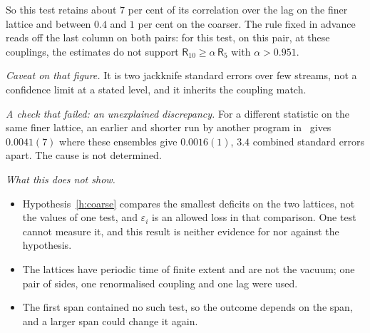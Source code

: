 So this test retains about $7$ per cent of its correlation over the lag on the finer lattice and between
$0.4$ and $1$ per cent on the coarser. The rule fixed in advance reads off the last column on both pairs: for
this test, on this pair, at these couplings, the estimates do not support
$\mathsf R_{10}\ge\alpha\,\mathsf R_5$ with $\alpha>0.951$.

\emph{Caveat on that figure.} It is two jackknife standard errors over few streams, not a confidence limit at
a stated level, and it inherits the coupling match.

\emph{A check that failed: an unexplained discrepancy.} For a different statistic on the same finer lattice,
an earlier and shorter run by another program in~\cite{RepoData} gives $0.0041(7)$ where these ensembles give
$0.0016(1)$, $3.4$ combined standard errors apart. The cause is not determined.

\emph{What this does not show.}
\begin{itemize}
\item Hypothesis~\ref{h:coarse} compares the smallest deficits on the two lattices, not the values of one
test, and $\varepsilon_i$ is an allowed loss in that comparison. One test cannot measure it, and this result
is neither evidence for nor against the hypothesis.
\item The lattices have periodic time of finite extent and are not the vacuum; one pair of sides, one
renormalised coupling and one lag were used.
\item The first span contained no such test, so the outcome depends on the span, and a larger span could
change it again.
\end{itemize}
